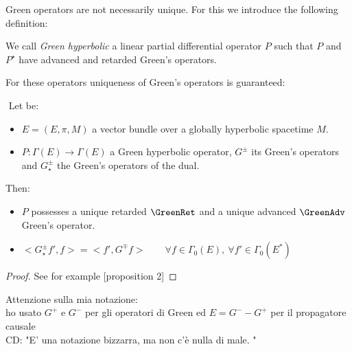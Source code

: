 \documentclass[Main]{subfiles}
\begin{document}
			Green operators are not necessarily unique. For this we introduce the following definition:
			\begin{definition}
				We call \emph{Green hyperbolic} a
				linear partial differential operator $P$ 
				such that $P$ and $P^\star$ have advanced and retarded Green’s operators.
			\end{definition}
			For these operators uniqueness of Green's operators is guaranteed:
			\begin{theorem}
				$ $
					Let be:
					\begin{itemize}
						\item $E=(E,\pi,M)$ a vector bundle over a globally hyperbolic spacetime $M$.
						\item $P:\Gamma(E) \rightarrow \Gamma(E)$ a Green hyperbolic operator, $G^\pm$ its Green's operators and $G_\star^\pm$ the Green's operators of the dual.					
					\end{itemize}
					Then:
					\begin{itemize}
					\item $P$ possesses a unique retarded $\GreenRet$ and a unique advanced $\GreenAdv$ Green's operator.
					\item $<G_\star^\pm f', f> = <f', G^\mp f > \qquad \forall f \in \Gamma_0(E),\: \forall f' \in \Gamma_0(E^*)$
					\end{itemize}
			\end{theorem}
			\begin{proof}
			See for example \cite{Benini}[proposition 2]
			\end{proof}

\ifToninus
	\begin{Warning}
		Attenzione sulla mia notazione:\\
		ho usato $G^+$ e $G^-$ per gli operatori di Green ed $E= G^- - G^+$ per il propagatore causale\\
		CD: "E' una notazione bizzarra, ma non c'è nulla di male. "
	\end{Warning}
\fi
\end{document}
